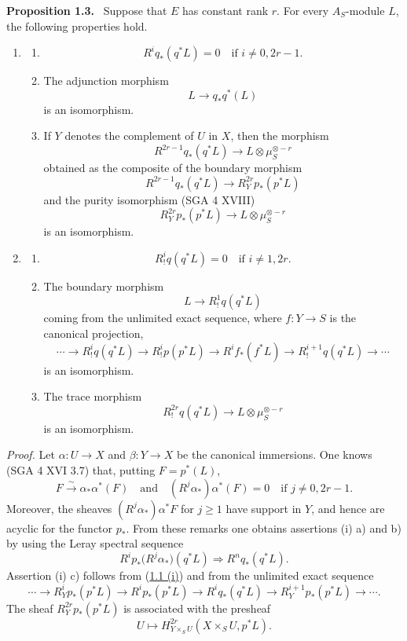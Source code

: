\documentclass[11pt]{article}
\newenvironment{statement}[1]{\par\medskip\noindent\textbf{#1.}\ }{\par\medskip}
\begin{document}
\label{sga5:VII:proposition:1.3}\begin{statement}{Proposition 1.3}
Suppose that $E$ has constant rank $r$. For every $A_S$-module $L$, the following properties hold.
\begin{enumerate}[label=(\roman*)]
\item
\begin{enumerate}[label=\alph*)]
\item
\[
R^i q_*(q^*L)=0\quad\text{if }i\ne 0,2r-1.
\]
\item The adjunction morphism
\[
L\longrightarrow q_*q^*(L)
\]
is an isomorphism.
\item If $Y$ denotes the complement of $U$ in $X$, then the morphism
\[
R^{2r-1}q_*(q^*L)\longrightarrow L\otimes\mu_S^{\otimes -r}
\]
obtained as the composite of the boundary morphism
\[
R^{2r-1}q_*(q^*L)\longrightarrow R_Y^{2r}p_*(p^*L)
\tag{1}\label{sga5:VII:equation:1}
\]
and the purity isomorphism (SGA 4 XVIII)
\[
R_Y^{2r}p_*(p^*L)\longrightarrow L\otimes\mu_S^{\otimes -r}
\]
is an isomorphism.
\end{enumerate}
\item
\begin{enumerate}[label=\alph*)]
\item
\[
R_!^i q(q^*L)=0\quad\text{if }i\ne 1,2r.
\]
\item The boundary morphism
\[
L\longrightarrow R_!^1 q(q^*L)
\]
coming from the unlimited exact sequence, where $f:Y\to S$ is the canonical projection,
\[
\cdots\longrightarrow R_!^i q(q^*L)\longrightarrow R_!^i p(p^*L)
\longrightarrow R^i f_*(f^*L)\longrightarrow R_!^{i+1}q(q^*L)\longrightarrow\cdots
\]
is an isomorphism.
\item The trace morphism
\[
R_!^{2r}q(q^*L)\longrightarrow L\otimes\mu_S^{\otimes -r}
\]
is an isomorphism.
\end{enumerate}
\end{enumerate}
\end{statement}

\emph{Proof.} Let $\alpha:U\to X$ and $\beta:Y\to X$ be the canonical immersions. One knows (SGA 4 XVI 3.7) that, putting $F=p^*(L)$,
\[
F\xrightarrow{\sim}\alpha_*\alpha^*(F)
\quad\text{and}\quad
(R^j\alpha_*)\alpha^*(F)=0\quad\text{if }j\ne0,2r-1.
\]
Moreover, the sheaves $(R^j\alpha_*)\alpha^*F$ for $j\ge1$ have support in $Y$, and hence are acyclic for the functor $p_*$. From these remarks one obtains assertions (i) a) and b) by using the Leray spectral sequence
\[
R^i p_*\bigl(R^j\alpha_*\bigr)(q^*L)\Longrightarrow R^n q_*(q^*L).
\]
Assertion (i) c) follows from (\hyperref[sga5:VII:proposition:1.1]{1.1 (i)}) and from the unlimited exact sequence
\[
\cdots\longrightarrow R_Y^i p_*(p^*L)\longrightarrow R^i p_*(p^*L)\longrightarrow R^i q_*(q^*L)
\longrightarrow R_Y^{i+1}p_*(p^*L)\longrightarrow\cdots.
\]
The sheaf $R_Y^{2r}p_*(p^*L)$ is associated with the presheaf
\[
U\longmapsto H^{2r}_{Y\times_S U}(X\times_S U,p^*L).
\]
\end{document}
